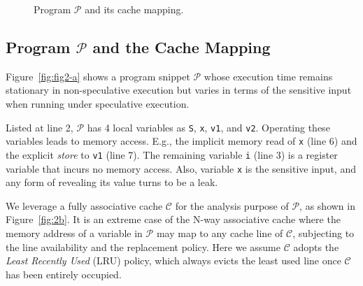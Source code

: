 \documentclass[sigconf]{acmart}
\newcommand{\prog}{\mathcal{P}}
\begin{document}
\begin{figure}
{\begin{minipage}{0.3\linewidth}
\end{minipage}
}
\vspace{-3ex}
\caption{Program $\mathcal{P}$ and its cache mapping.}
\label{fig:motiv}
\vspace{-2ex}
\end{figure}


\subsection{Program ${\prog}$ and the Cache Mapping}
\label{sec:leak_example}

Figure~\ref{fig:fig2-a} shows a program snippet ${\prog}$ whose execution 
time remains stationary in non-speculative execution but varies in terms
of the sensitive input when running under speculative execution.


Listed at line 2, ${\prog}$ has 4 local variables as \texttt{S}, \texttt{x}, 
\texttt{v1}, and \texttt{v2}. Operating these variables leads to memory 
access. E.g., the implicit memory read of \texttt{x} (line 6) and the 
explicit \emph{store} to \texttt{v1} (line 7). The remaining variable 
\texttt{i} (line 3) is a register variable that incurs no memory access. 
Also, variable \texttt{x} is the sensitive input, and any form of revealing 
its value turns to be a leak. 


We leverage a fully associative cache $\mathcal{C}$ for the analysis purpose 
of $\prog$, as shown in Figure~\ref{fig:2b}. It is an extreme case of the 
N-way associative cache where the memory address of a variable in $\prog$ may 
map to any cache line of $\mathcal{C}$, subjecting to the line availability 
and the replacement policy. Here we assume $\mathcal{C}$ adopts the \emph{Least
Recently Used} (LRU) policy, which always evicts the least used line once 
$\mathcal{C}$ has been entirely occupied.
\end{document}
